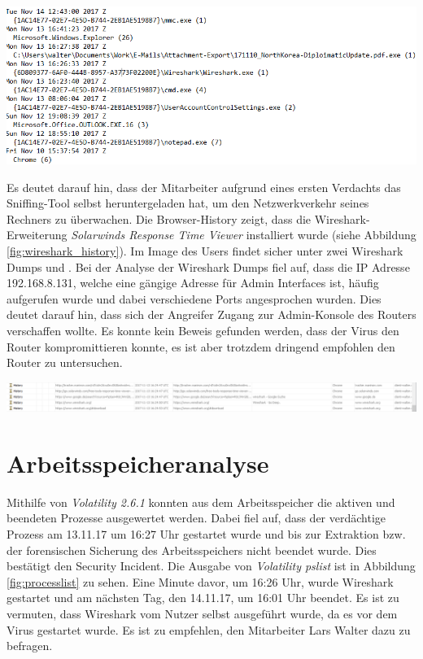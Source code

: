 \begin{center}
	\includegraphics[width=15.8cm]{figures/wireshark_paths.png}
	\label{fig:wireshark_paths}
\end{center}

Es deutet darauf hin, dass der Mitarbeiter aufgrund eines ersten Verdachts das Sniffing-Tool selbst heruntergeladen hat, um den Netzwerkverkehr seines Rechners zu überwachen.
Die Browser-History zeigt, dass die Wireshark-Erweiterung \textit{Solarwinds Response Time Viewer} installiert wurde (siehe Abbildung \ref{fig:wireshark_history}).
Im Image des Users findet sicher unter  zwei Wireshark Dumps  und .
Bei der Analyse der Wireshark Dumps fiel auf, dass die IP Adresse 192.168.8.131, welche eine gängige Adresse für Admin Interfaces ist, häufig aufgerufen wurde und dabei verschiedene Ports angesprochen wurden.
Dies deutet darauf hin, dass sich der Angreifer Zugang zur Admin-Konsole des Routers verschaffen wollte.
Es konnte kein Beweis gefunden werden, dass der Virus den Router kompromittieren konnte, es ist aber trotzdem dringend empfohlen den Router zu untersuchen.

\begin{center}
	\includegraphics[width=15.8cm]{figures/wireshark_history.PNG}
	\label{fig:wireshark_history}
\end{center}

\section{Arbeitsspeicheranalyse}
Mithilfe von \textit{Volatility 2.6.1} konnten aus dem Arbeitsspeicher die aktiven und beendeten Prozesse ausgewertet werden.
Dabei fiel auf, dass der verdächtige Prozess  am 13.11.17 um 16:27 Uhr gestartet wurde und bis zur Extraktion bzw. der forensischen Sicherung des Arbeitsspeichers nicht beendet wurde.
Dies bestätigt den Security Incident. Die Ausgabe von \textit{Volatility pslist} ist in Abbildung \ref{fig:processlist} zu sehen.
Eine Minute davor, um 16:26 Uhr, wurde Wireshark gestartet und am nächsten Tag, den 14.11.17, um 16:01 Uhr beendet.
Es ist zu vermuten, dass Wireshark vom Nutzer selbst ausgeführt wurde, da es vor dem Virus gestartet wurde.
Es ist zu empfehlen, den Mitarbeiter Lars Walter dazu zu befragen.

